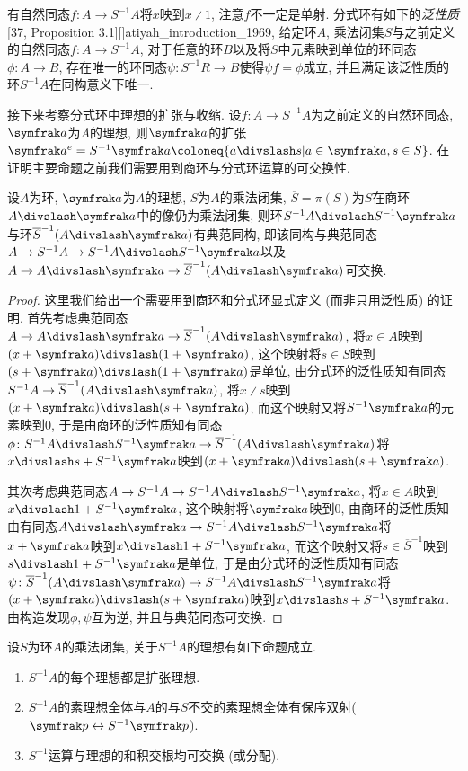 有自然同态$f\colon A\to S^{-1}A$将$x$映到$x{\divslash}1$, 注意$f$不一定是单射. 分式环有如下的\emph{泛性质}[37, Proposition 3.1][]{atiyah_introduction_1969}, 给定环$A$, 乘法闭集$S$与之前定义的自然同态$f\colon A\to S^{-1}A$, 对于任意的环$B$以及将$S$中元素映到单位的环同态$\phi\colon A\to B$, 存在唯一的环同态$\psi\colon S^{-1}R\to B$使得$\psi f=\phi$成立, 并且满足该泛性质的环$S^{-1}A$在同构意义下唯一.

接下来考察分式环中理想的扩张与收缩. 设$f\colon A\to S^{-1}A$为之前定义的自然环同态, $\ideal{a}$为$A$的理想, 则$\ideal{a}$的扩张$\ideal{a}^e=S^{-1}\ideal{a}\coloneq \{a{\divslash}s\vert a\in\ideal{a}, s\in S\}$. 在证明主要命题之前我们需要用到商环与分式环运算的可交换性.

\begin{proposition}\label{prop:localizationquotientcommute}
  设$A$为环, $\ideal{a}$为$A$的理想, $S$为$A$的乘法闭集, $\overline{S}=\pi(S)$为$S$在商环$A{\divslash}\ideal{a}$中的像仍为乘法闭集, 则环$\SASa$与环$\SAa$有典范同构, 即该同构与典范同态$A\to S^{-1}A\to \SASa$以及$A\to A{\divslash}\ideal{a}\to \SAa$可交换.
\end{proposition}

\begin{proof}
  这里我们给出一个需要用到商环和分式环显式定义 (而非只用泛性质) 的证明. 首先考虑典范同态$A\to A{\divslash}\ideal{a}\to \SAa$, 将$x\in A$映到$(x+\ideal{a}){\divslash}(1+\ideal{a})$, 这个映射将$s\in S$映到$(s+\ideal{a}){\divslash}(1+\ideal{a})$是单位, 由分式环的泛性质知有同态$S^{-1}A\to \SAa$, 将$x{\divslash}s$映到$(x+\ideal{a}){\divslash}(s+\ideal{a})$, 而这个映射又将$S^{-1}\ideal{a}$的元素映到0, 于是由商环的泛性质知有同态$\phi\colon\SASa\to\SAa$将$x{\divslash}s + S^{-1}\ideal{a}$映到$(x+\ideal{a}){\divslash}(s+\ideal{a})$.

  其次考虑典范同态$A\to S^{-1}A\to\SASa$, 将$x\in A$映到$x{\divslash}1+S^{-1}\ideal{a}$, 这个映射将$\ideal{a}$映到0, 由商环的泛性质知由有同态$A{\divslash}\ideal{a}\to\SASa$将$x+\ideal{a}$映到$x{\divslash}1+S^{-1}\ideal{a}$, 而这个映射又将$s\in\overline{S}^{-1}$映到$s{\divslash}1+S^{-1}\ideal{a}$是单位, 于是由分式环的泛性质知有同态$\psi\colon\SAa\to\SASa$将$(x+\ideal{a}){\divslash}(s+\ideal{a})$映到$x{\divslash}s + S^{-1}\ideal{a}$. 由构造发现$\phi, \psi$互为逆, 并且与典范同态可交换.
\end{proof}

\begin{proposition}\label{prop:fracideal}
  设$S$为环$A$的乘法闭集, 关于$S^{-1}A$的理想有如下命题成立.
  \begin{enumerate}
    \item\label{enum:prop-fracideal-1} $S^{-1}A$的每个理想都是扩张理想.
    \item\label{enum:prop-fracideal-2} $S^{-1}A$的素理想全体与$A$的与$S$不交的素理想全体有保序双射($\ideal{p}\leftrightarrow S^{-1}\ideal{p}$).
    \item\label{enum:prop-fracideal-3} $S^{-1}$运算与理想的和积交根均可交换 (或分配).
  \end{enumerate}
\end{proposition}


